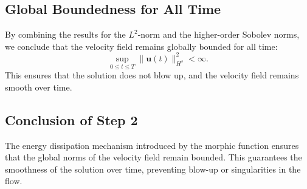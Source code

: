 \documentclass{article}
\begin{document}
\subsection*{Global Boundedness for All Time}

By combining the results for the \( L^2 \)-norm and the higher-order Sobolev norms, we conclude that the velocity field remains globally bounded for all time:
\[
\sup_{0 \leq t \leq T} \|\mathbf{u}(t)\|_{H^s}^2 < \infty.
\]
This ensures that the solution does not blow up, and the velocity field remains smooth over time.

\subsection*{Conclusion of Step 2}

The energy dissipation mechanism introduced by the morphic function ensures that the global norms of the velocity field remain bounded. This guarantees the smoothness of the solution over time, preventing blow-up or singularities in the flow.
\end{document}
